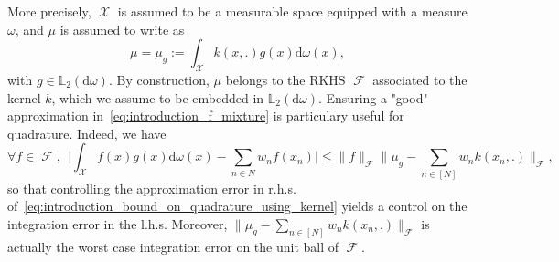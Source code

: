 \documentclass[twoside,11pt]{book}
\numberwithin{theorem}{chapter}
\numberwithin{definition}{chapter}
\numberwithin{proposition}{chapter}
\numberwithin{corollary}{chapter}
\numberwithin{example}{chapter}
\numberwithin{lemma}{chapter}
\numberwithin{assumption}{chapter}
\numberwithin{equation}{chapter}
\numberwithin{figure}{chapter}
\DeclareMathOperator{\F}{\mathcal{F}}
\DeclareMathOperator{\X}{\mathcal{X}}
\begin{document}
More precisely, $\X$ is assumed to be a measurable space equipped with a measure $\omega$, and $\mu$ is assumed to write as
\begin{equation}
\mu = \mu_{g} := \int_{\X}k(x,.)g(x) \mathrm{d}\omega(x),
\end{equation}
with $g \in \mathbb{L}_{2}(\mathrm{d}\omega)$. By construction, $\mu$ belongs to the RKHS $\F$ associated to the kernel $k$, which we assume to be embedded in $\mathbb{L}_{2}(\mathrm{d}\omega)$. Ensuring a "good" approximation in~\eqref{eq:introduction_f_mixture} is particulary useful for quadrature. Indeed, we have
\begin{equation}\label{eq:introduction_bound_on_quadrature_using_kernel}
\forall f \in \F, \:\: \Big| \int_{\X} f(x)g(x)\mathrm{d}\omega(x) - \sum\limits_{n \in N}w_{n}f(x_{n})  \Big| \leq \|f\|_{\F} \Big\|\mu_{g} - \sum\limits_{n \in [N]} w_{n}k(x_{n},.) \Big\|_{\F},
\end{equation}
so that controlling the approximation error in r.h.s. of~\eqref{eq:introduction_bound_on_quadrature_using_kernel} yields a control on the integration error in the l.h.s.
Moreover, $\|\mu_{g} - \sum_{n \in [N]} w_{n}k(x_{n},.) \|_{\F}$ is actually the worst case integration error on the unit ball of $\F$. 


\end{document}
